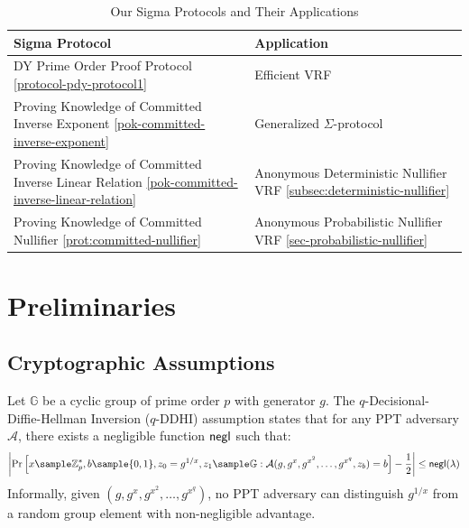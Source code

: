 \begin{table}[htbp]
\centering
\caption{Our Sigma Protocols and Their Applications}
\label{tab:nullifier-protocols}
\begin{tabular}{p{}|p{}}
\toprule
\textbf{Sigma Protocol} & \textbf{Application} \\
\midrule
DY Prime Order Proof Protocol \ref{protocol-pdy-protocol1} & Efficient VRF \\
\midrule
Proving Knowledge of Committed Inverse Exponent  \ref{pok-committed-inverse-exponent} & Generalized $\Sigma$-protocol \\
\midrule
Proving Knowledge of Committed Inverse Linear Relation \ref{pok-committed-inverse-linear-relation} & Anonymous Deterministic Nullifier VRF \ref{subsec:deterministic-nullifier}\\
\midrule
Proving Knowledge of Committed Nullifier \ref{prot:committed-nullifier} & Anonymous Probabilistic Nullifier VRF \ref{sec-probabilistic-nullifier} \\
\bottomrule
\end{tabular}
\end{table}




\section{Preliminaries}\label{sec-vrf-preliminaries}

\subsection{Cryptographic Assumptions}

\begin{definition}
Let $\mathbb{G}$ be a cyclic group of prime order $p$ with generator $g$. The $q$-Decisional-Diffie-Hellman Inversion ($q$-DDHI) \cite{mitsunari_new_2002} assumption states that for any PPT adversary $\mathcal{A}$, there exists a negligible function $\mathsf{negl}$ such that:
\[
\left|\Pr\left[ x \sample \Zp^*, b \sample \{0,1\}, z_0 = g^{1/x}, z_1 \sample \G : \mathcal{A}(g, g^x, g^{x^2}, \ldots, g^{x^q}, z_b) = b \right] - \frac{1}{2}\right| \leq \negl(\lambda)
\]
Informally, given $(g, g^x, g^{x^2}, \ldots, g^{x^q})$, no PPT adversary can distinguish $g^{1/x}$ from a random group element with non-negligible advantage.
\end{definition}


